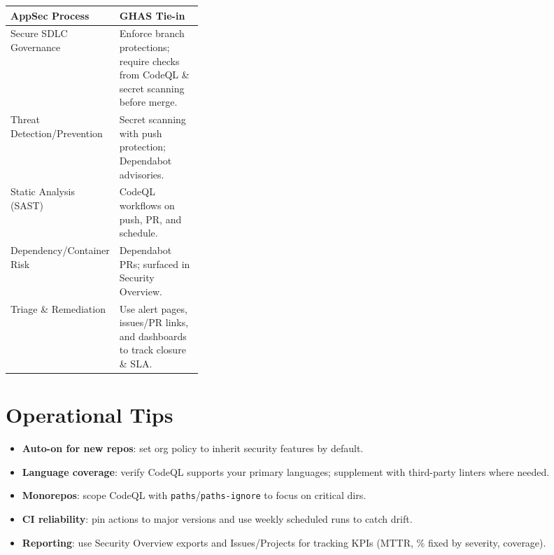 \documentclass[10pt,a4paper]{article}
\begin{document}
\begin{tabularx}{\linewidth}{@{}>{\raggedright\arraybackslash}p{0.32\linewidth}X@{}}
\toprule
\textbf{AppSec Process} & \textbf{GHAS Tie-in}\\
\midrule
Secure SDLC Governance & Enforce branch protections; require checks from CodeQL \& secret scanning before merge.\\
Threat Detection/Prevention & Secret scanning with push protection; Dependabot advisories.\\
Static Analysis (SAST) & CodeQL workflows on push, PR, and schedule.\\
Dependency/Container Risk & Dependabot PRs; surfaced in Security Overview.\\
Triage \& Remediation & Use alert pages, issues/PR links, and dashboards to track closure \& SLA.\\
\bottomrule
\end{tabularx}

\section{Operational Tips}

\begin{itemize}
  \item \textbf{Auto-on for new repos}: set org policy to inherit security features by default.
  \item \textbf{Language coverage}: verify CodeQL supports your primary languages; supplement with third-party linters where needed.
  \item \textbf{Monorepos}: scope CodeQL with \texttt{paths}/\texttt{paths-ignore} to focus on critical dirs.
  \item \textbf{CI reliability}: pin actions to major versions and use weekly scheduled runs to catch drift.
  \item \textbf{Reporting}: use Security Overview exports and Issues/Projects for tracking KPIs (MTTR, \% fixed by severity, coverage).
\end{itemize}
\end{document}

